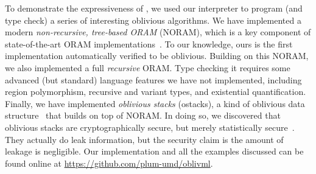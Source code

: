 To demonstrate the expressiveness of \obliv, we used our interpreter to
program (and type check) a series of interesting oblivious
algorithms. We have implemented a modern \emph{non-recursive, tree-based ORAM} (NORAM), which
is a key component of state-of-the-art ORAM implementations~\cite{asiacrypt11,pathoram,circuitoram}.
To our knowledge, ours is the first implementation automatically verified to
be oblivious. Building on this NORAM, we also implemented a full \emph{recursive} ORAM.
Type checking it requires some advanced (but standard) language features we
have not implemented, including region polymorphism, recursive and variant
types, and existential quantification. Finally, we have implemented \emph{oblivious stacks}
(ostacks), a kind of oblivious data structure~\cite{ods} that builds on top of NORAM.
In doing so, we discovered that oblivious stacks are cryptographically secure, but merely
statistically secure~\cite{sweet-plas21}. They actually do leak information, but the security claim is the
amount of leakage is negligible. Our implementation and all the examples discussed can be
found online at \url{https://github.com/plum-umd/oblivml}.
